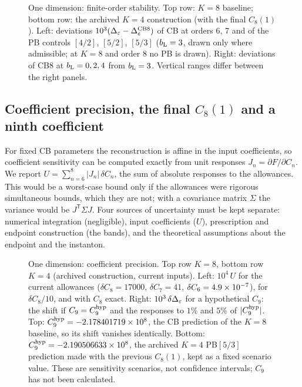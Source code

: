 \begin{figure}[htbp]\centering
{}
\caption{One dimension: finite-order stability. Top row: $K=8$ baseline; bottom row: the
archived $K=4$ construction (with the final $C_8(1)$). Left: deviations
$10^3(\Delta_\varepsilon-\Delta_\varepsilon^{\rm CB8})$ of CB at orders 6, 7 and of the PB controls $[4/2]$, $[5/2]$, $[5/3]$
($b_{\mathrm L}=3$, drawn only where admissible; at $K=8$ and order 8 no PB is drawn). Right: deviations of
CB8 at $b_{\mathrm L}=0,2,4$ from $b_{\mathrm L}=3$. Vertical ranges differ between the right panels.}
\label{rs:fig:stability}
\end{figure}

\subsection{\texorpdfstring{Coefficient precision, the final $C_8(1)$ and a ninth coefficient}{Coefficient precision, the final C8(1) and a ninth coefficient}}
For fixed CB parameters the reconstruction is affine in the input coefficients, so
coefficient sensitivity can be computed exactly from unit responses $J_n=\partial F/\partial
C_n$. We report $U=\sum_{n=6}^8|J_n|\,\delta C_n$, the sum of absolute responses to the
allowances. This would be a worst-case bound only if the allowances were rigorous
simultaneous bounds, which they are not; with a covariance matrix $\Sigma$ the variance would
be $J^{\mathsf T}\Sigma J$. Four sources of uncertainty must be kept separate: numerical
integration (negligible), input coefficients ($U$), prescription and endpoint construction (the
bands), and the theoretical assumptions about the endpoint and the instanton.

\begin{figure}[htbp]\centering
{}
\caption{One dimension: coefficient precision. Top row $K=8$, bottom row $K=4$ (archived
construction, current inputs). Left: $10^4\,U$ for the current allowances
($\delta C_8=17000$, $\delta C_7=41$, $\delta C_6=4.9\times10^{-7}$), for $\delta C_8/10$, and with $C_8$
exact. Right: $10^3\,\delta\Delta_\varepsilon$ for a hypothetical $C_9$: the shift if
$C_9=C_9^{\rm hyp}$ and the responses to $1\%$ and $5\%$ of $|C_9^{\rm hyp}|$. Top:
$C_9^{\rm hyp}=-2.178401719\times10^{8}$, the CB prediction of the $K=8$ baseline, so its shift
vanishes identically. Bottom: $C_9^{\rm hyp}=-2.190506633\times10^{8}$, the archived $K=4$
PB$[5/3]$ prediction made with the previous $C_8(1)$, kept as a fixed scenario value. These are
sensitivity scenarios, not confidence intervals; $C_9$ has not been calculated.}
\label{rs:fig:precision}
\end{figure}

